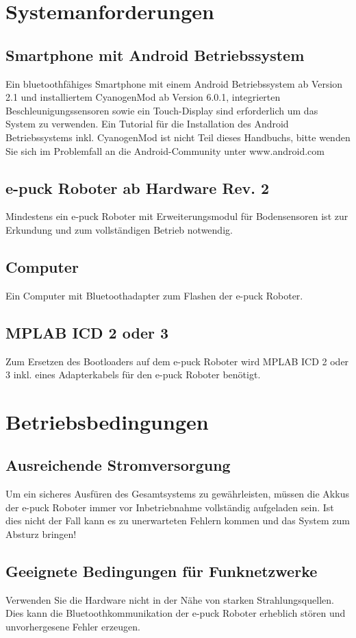 \documentclass[10pt,a4paper]{article}
\let\oldsection\section
\renewcommand{\section}{\newpage \oldsection}
\begin{document}
\section{Systemanforderungen}
		\subsection{Smartphone mit Android Betriebssystem} 
				Ein bluetoothf\"ahiges Smartphone mit einem Android Betriebssystem ab Version 2.1 und installiertem CyanogenMod ab Version 6.0.1, integrierten 
				Beschleunigungssensoren sowie ein Touch-Display sind erforderlich um das System zu verwenden. Ein Tutorial f\"ur die Installation des Android 
				Betriebssystems inkl. CyanogenMod ist nicht Teil dieses Handbuchs, bitte wenden Sie sich im Problemfall an die Android-Community unter 
				www.android.com
		\subsection{e-puck Roboter ab Hardware Rev. 2} 
				Mindestens ein e-puck Roboter mit Erweiterungsmodul f\"ur Bodensensoren ist zur Erkundung und zum vollst\"andigen Betrieb notwendig.
		\subsection{Computer} 
				Ein Computer mit Bluetoothadapter zum Flashen der e-puck Roboter.
		\subsection{MPLAB ICD 2 oder 3} 
				Zum Ersetzen des Bootloaders auf dem e-puck Roboter wird MPLAB ICD 2 oder 3 inkl. eines Adapterkabels f\"ur den e-puck Roboter ben\"otigt.
\section{Betriebsbedingungen} 
		\subsection{Ausreichende Stromversorgung} 
				Um ein sicheres Ausf\"uren des Gesamtsystems zu gew\"ahrleisten, m\"ussen die Akkus der e-puck Roboter immer vor Inbetriebnahme vollst\"andig
				aufgeladen sein. Ist dies nicht der Fall kann es zu unerwarteten Fehlern kommen und das System zum Absturz bringen!
		\subsection{ Geeignete Bedingungen f\"ur Funknetzwerke} 
				Verwenden Sie die Hardware nicht in der N\"ahe von starken Strahlungsquellen. Dies kann die Bluetoothkommunikation der e-puck Roboter erheblich st\"oren 				und unvorhergesene Fehler erzeugen.
\end{document}
